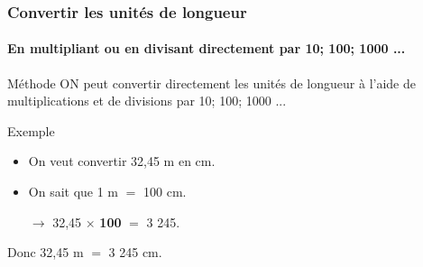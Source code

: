 \documentclass[xcolor=table]{beamer}
\begin{document}
\begin{frame}
	\frametitle{Convertir les unités de longueur}  
	\framesubtitle{En multipliant ou en divisant directement par 10; 100; 1000 ...}	
	
	\begin{alertblock}{Méthode}
		ON peut convertir directement les unités de longueur à l'aide de multiplications et de divisions par 10; 100; 1000 ...
	\end{alertblock}
	
	\begin{block}{Exemple}
		\begin{itemize}
			\item On veut convertir 32,45 m en cm.
			\item On sait que 1 m $=$ 100 cm.
			\item[$\rightarrow$] 32,45 $\times$ \textbf{100} $=$ 3 245.
		\end{itemize}
		
		Donc 32,45 m $=$ 3 245 cm.		
	\end{block}
	
\end{frame}
\end{document}
